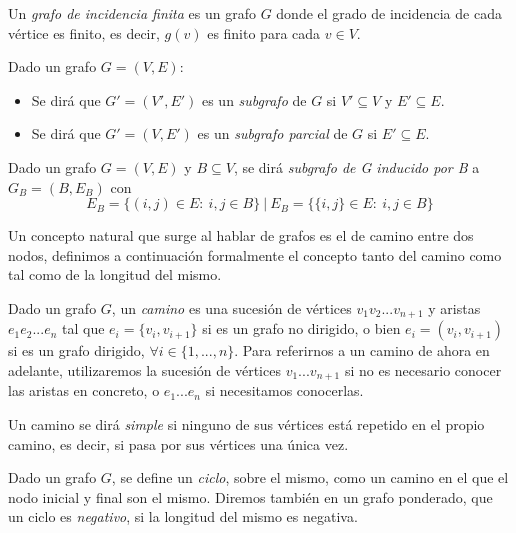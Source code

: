 \begin{definicion}
	Un \textit{grafo de incidencia finita} es un grafo $G$ donde el grado de incidencia de cada vértice es finito, es decir, $g(v)$ es finito para cada $v\in V$.
\end{definicion}

\begin{definicion}
	Dado un grafo $G=(V,E)$: 
	\begin{itemize}
		\item Se dirá que $G'=(V',E')$ es un \textit{subgrafo} de $G$ si $V'\subseteq V$ y $E'\subseteq E$.
		\item Se dirá que $G'=(V,E')$ es un \textit{subgrafo parcial} de $G$ si $E'\subseteq E$.
	\end{itemize} 
\end{definicion}

\begin{definicion}
	Dado un grafo $G=(V,E)$ y $B\subseteq V$, se dirá \textit{subgrafo de G inducido por B} a $G_B=(B,E_B)$ con
	$$E_B=\{(i,j)\in E:\ i,j\in B\}\ |\ E_B=\{\{i,j\}\in E:\ i,j\in B\}$$
\end{definicion}

Un concepto natural que surge al hablar de grafos es el de camino entre dos nodos, definimos a continuación formalmente el concepto tanto del camino como tal como de la longitud del mismo.

\begin{definicion}
	Dado un grafo $G$, un \textit{camino} es una sucesión de vértices $v_1v_2...v_{n+1}$ y aristas $e_1e_2...e_n$ tal que $e_i=\{v_i,v_{i+1}\}$ si es un grafo no dirigido, o bien $e_i=(v_i,v_{i+1})$ si es un grafo dirigido, $\forall i \in \{1,...,n\}$. Para referirnos a un camino de ahora en adelante, utilizaremos la sucesión de vértices $v_1...v_{n+1}$ si no es necesario conocer las aristas en concreto, o $e_1...e_n$ si necesitamos conocerlas.
\end{definicion}

\begin{definicion}
	Un camino se dirá \textit{simple} si ninguno de sus vértices está repetido en el propio camino, es decir, si pasa por sus vértices una única vez.
\end{definicion}

\begin{definicion}
	Dado un grafo $G$, se define un \textit{ciclo}, sobre el mismo, como un camino en el que el nodo inicial y final son el mismo. Diremos también en un grafo ponderado, que un ciclo es \textit{negativo}, si la longitud del mismo es negativa.
\end{definicion}

